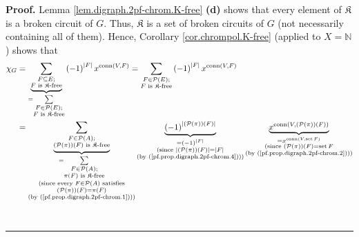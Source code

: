 \documentclass[numbers=enddot,12pt,final,onecolumn,notitlepage]{scrartcl}%
\theoremstyle{definition}
\newenvironment{proof}[1][Proof]{\noindent\textbf{#1.} }{\ \rule{0.5em}{0.5em}}
\newenvironment{verlong}{}{}
\let\sumnonlimits\sum
\renewcommand{\sum}{\sumnonlimits\limits}
\begin{document}
\begin{verlong}
\begin{proof}
Lemma \ref{lem.digraph.2pf-chrom.K-free} \textbf{(d)} shows that every element
of $\mathfrak{K}$ is a broken circuit of $G$. Thus, $\mathfrak{K}$ is a set of
broken circuits of $G$ (not necessarily containing all of them). Hence,
Corollary \ref{cor.chrompol.K-free} (applied to $X=\mathbb{N}$) shows that%
\begin{align*}
\chi_{G}  &  =\underbrace{\sum_{\substack{F\subseteq E;\\F\text{ is
}\mathfrak{K}\text{-free}}}}_{=\sum_{\substack{F\in\mathcal{P}\left(
E\right)  ;\\F\text{ is }\mathfrak{K}\text{-free}}}}\left(  -1\right)
^{\left\vert F\right\vert }x^{\operatorname*{conn}\left(  V,F\right)  }%
=\sum_{\substack{F\in\mathcal{P}\left(  E\right)  ;\\F\text{ is }%
\mathfrak{K}\text{-free}}}\left(  -1\right)  ^{\left\vert F\right\vert
}x^{\operatorname*{conn}\left(  V,F\right)  }\\
&  =\underbrace{\sum_{\substack{F\in\mathcal{P}\left(  A\right)  ;\\\left(
\mathcal{P}\left(  \pi\right)  \right)  \left(  F\right)  \text{ is
}\mathfrak{K}\text{-free}}}}_{\substack{=\sum_{\substack{F\in\mathcal{P}%
\left(  A\right)  ;\\\pi\left(  F\right)  \text{ is }\mathfrak{K}\text{-free}%
}}\\\text{(since every }F\in\mathcal{P}\left(  A\right)  \text{ satisfies}%
\\\left(  \mathcal{P}\left(  \pi\right)  \right)  \left(  F\right)
=\pi\left(  F\right)  \\\text{(by (\ref{pf.prop.digraph.2pf-chrom.1})))}%
}}\underbrace{\left(  -1\right)  ^{\left\vert \left(  \mathcal{P}\left(
\pi\right)  \right)  \left(  F\right)  \right\vert }}_{\substack{=\left(
-1\right)  ^{\left\vert F\right\vert }\\\text{(since }\left\vert \left(
\mathcal{P}\left(  \pi\right)  \right)  \left(  F\right)  \right\vert
=\left\vert F\right\vert \\\text{(by (\ref{pf.prop.digraph.2pf-chrom.4})))}%
}}\underbrace{x^{\operatorname*{conn}\left(  V,\left(  \mathcal{P}\left(
\pi\right)  \right)  \left(  F\right)  \right)  }}%
_{\substack{=x^{\operatorname*{conn}\left(  V,\operatorname*{set}F\right)
}\\\text{(since }\left(  \mathcal{P}\left(  \pi\right)  \right)  \left(
F\right)  =\operatorname*{set}F\\\text{(by (\ref{pf.prop.digraph.2pf-chrom.2}%
)))}}}\\

\end{align*}
\end{proof}
\end{verlong}
\end{document}
